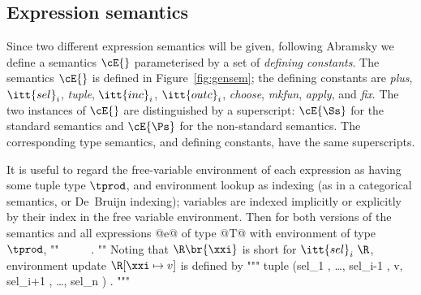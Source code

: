 \documentclass[11pt]{article}
\begin{document}
\subsection{Expression semantics}
Since two different expression semantics will be given, following
Abramsky \cite{Abr90} we define a semantics $\cE{}$ parameterised by a
set of {\it defining constants}.  The semantics $\cE{}$ is defined in
Figure~\ref{fig:gensem}; the defining constants are {\it plus},
$\itt{sel}_i$, {\it tuple}, $\itt{inc}_i$, $\itt{outc}_i$, {\it
choose}, {\it mkfun}, {\it apply}, and {\it fix}.  The two instances
of $\cE{}$ are distinguished by a superscript: $\cE{\Ss}$ for the
standard semantics and $\cE{\Ps}$ for the non-standard semantics.  The
corresponding type semantics, and defining constants, have the same 
superscripts.

It is useful to regard the free-variable environment of each
expression as having some tuple type $\tprod$, and environment lookup
as indexing (as in a categorical semantics, or De~Bruijn indexing);
variables are indexed implicitly or explicitly by their index in the
free variable environment.  Then for both versions of the semantics
and all expressions @e@ of type @T@ with environment of type $\tprod$,
""
	\ \in\ \Te{}{\tprod}~\fto~\ .
""
Noting that $\R\br{\xxi}$ is short for $\itt{sel}_i~\R$, environment
update $\R[\xxi\mapsto{}v]$ is defined by
"""
	tuple (sel_1 \R, \ldots, sel_{i-1} \R, v, sel_{i+1} \R, \ldots, sel_n \R) .
"""


\end{document}
